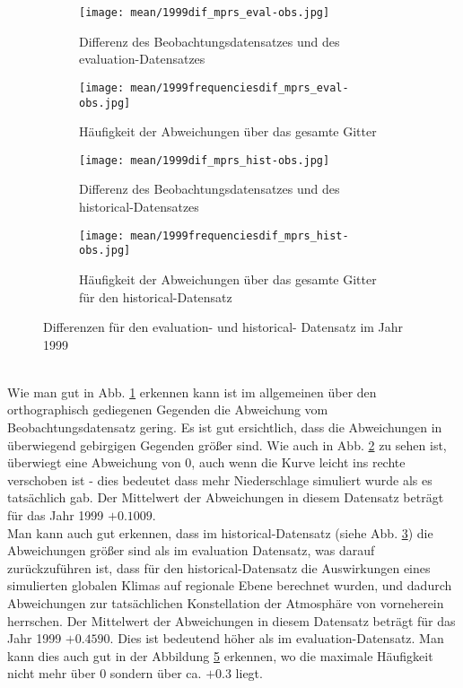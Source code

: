 \begin{figure}[hbt!]
	\centering
	\begin{subfigure}{0.49\textwidth}
		\centering
		\texttt{[image: mean/1999dif\_mprs\_eval-obs.jpg]}
		\caption{Differenz des Beobachtungsdatensatzes und des evaluation-Datensatzes}
		\label{fig:eval_dif}
	\end{subfigure}
	\begin{subfigure}{0.49\textwidth}
		\centering
		\texttt{[image: mean/1999frequenciesdif\_mprs\_eval-obs.jpg]}
		\caption{Häufigkeit der Abweichungen über das gesamte Gitter}
		\label{fig:eval_freq_dif}
	\end{subfigure}
	\begin{subfigure}{0.49\textwidth}
		\centering
		\texttt{[image: mean/1999dif\_mprs\_hist-obs.jpg]}
		\caption{Differenz des Beobachtungsdatensatzes und des historical-Datensatzes}
		\label{fig:hist_dif}
	\end{subfigure}
	\begin{subfigure}{0.49\textwidth}
		\centering
		\texttt{[image: mean/1999frequenciesdif\_mprs\_hist-obs.jpg]}
		\caption{Häufigkeit der Abweichungen über das gesamte Gitter für den historical-Datensatz}
		\label{fig:hist_freq_dif}
	\end{subfigure}
	\caption{Differenzen für den evaluation- und historical- Datensatz im Jahr 1999}
\end{figure}
\\
Wie man gut in Abb. \ref{fig:eval_dif} erkennen kann ist im allgemeinen über den orthographisch gediegenen Gegenden die Abweichung vom Beobachtungsdatensatz gering. Es ist gut ersichtlich, dass die Abweichungen in überwiegend gebirgigen Gegenden größer sind. Wie auch in Abb. \ref{fig:eval_freq_dif} zu sehen ist, überwiegt eine Abweichung von 0, auch wenn die Kurve leicht ins rechte verschoben ist - dies bedeutet dass mehr Niederschlage simuliert wurde als es tatsächlich gab. Der Mittelwert der Abweichungen in diesem Datensatz beträgt für das Jahr 1999 $+0.1009$.\\
Man kann auch gut erkennen, dass im historical-Datensatz (siehe Abb. \ref{fig:hist_dif}) die Abweichungen größer sind als im evaluation Datensatz, was darauf zurückzuführen ist, dass für den historical-Datensatz die Auswirkungen eines simulierten globalen Klimas auf regionale Ebene berechnet wurden, und dadurch Abweichungen zur tatsächlichen Konstellation der Atmosphäre von vorneherein herrschen. Der Mittelwert der Abweichungen in diesem Datensatz beträgt für das Jahr 1999 $+0.4590$. Dies ist bedeutend höher als im evaluation-Datensatz. Man kann dies auch gut in der Abbildung \ref{fig:hist_freq_dif} erkennen, wo die maximale Häufigkeit nicht mehr über $0$ sondern über ca. $+0.3$ liegt.\\
